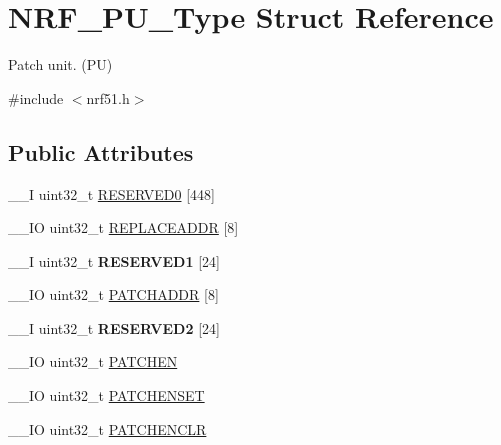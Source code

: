 \hypertarget{struct_n_r_f___p_u___type}{}\section{N\+R\+F\+\_\+\+P\+U\+\_\+\+Type Struct Reference}
\label{struct_n_r_f___p_u___type}


Patch unit. (P\+U)  




{\ttfamily \#include $<$nrf51.\+h$>$}

\subsection*{Public Attributes}
\begin{DoxyCompactItemize}
\item 
\+\_\+\+\_\+\+I uint32\+\_\+t \hyperlink{struct_n_r_f___p_u___type_ae85bd5d6ac8fe3129c6ca67aa812daa1}{R\+E\+S\+E\+R\+V\+E\+D0} \mbox{[}448\mbox{]}
\item 
\+\_\+\+\_\+\+I\+O uint32\+\_\+t \hyperlink{struct_n_r_f___p_u___type_ae79251eb357774997fb4b52138e05d43}{R\+E\+P\+L\+A\+C\+E\+A\+D\+D\+R} \mbox{[}8\mbox{]}
\item 
\hypertarget{struct_n_r_f___p_u___type_a9bacfb414aef4471bb35841a5be5b5cc}{}\+\_\+\+\_\+\+I uint32\+\_\+t {\bfseries R\+E\+S\+E\+R\+V\+E\+D1} \mbox{[}24\mbox{]}\label{struct_n_r_f___p_u___type_a9bacfb414aef4471bb35841a5be5b5cc}

\item 
\+\_\+\+\_\+\+I\+O uint32\+\_\+t \hyperlink{struct_n_r_f___p_u___type_aa04b141b5d070309b0afbd690f25b093}{P\+A\+T\+C\+H\+A\+D\+D\+R} \mbox{[}8\mbox{]}
\item 
\hypertarget{struct_n_r_f___p_u___type_a604251739ee85c5f38b05f978ffd14f8}{}\+\_\+\+\_\+\+I uint32\+\_\+t {\bfseries R\+E\+S\+E\+R\+V\+E\+D2} \mbox{[}24\mbox{]}\label{struct_n_r_f___p_u___type_a604251739ee85c5f38b05f978ffd14f8}

\item 
\+\_\+\+\_\+\+I\+O uint32\+\_\+t \hyperlink{struct_n_r_f___p_u___type_a11712ff642e166ffaaad3aa728e15e25}{P\+A\+T\+C\+H\+E\+N}
\item 
\+\_\+\+\_\+\+I\+O uint32\+\_\+t \hyperlink{struct_n_r_f___p_u___type_ab7899ebde7f7f7a6fd310cb27f287d5a}{P\+A\+T\+C\+H\+E\+N\+S\+E\+T}
\item 
\+\_\+\+\_\+\+I\+O uint32\+\_\+t \hyperlink{struct_n_r_f___p_u___type_a191ece527dd69824c849a59889af3740}{P\+A\+T\+C\+H\+E\+N\+C\+L\+R}
\end{DoxyCompactItemize}


